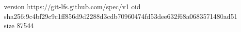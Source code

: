 version https://git-lfs.github.com/spec/v1
oid sha256:9c4bf29c9c1ff856d9d2288d3cdb70960474fd53dee632f68a0683571480ad51
size 87544
